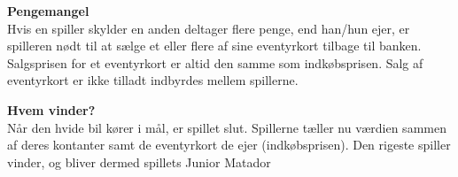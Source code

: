 \textbf{Pengemangel}
\\Hvis en spiller skylder en anden deltager flere penge, end han/hun ejer, er spilleren nødt til at sælge et eller flere af sine eventyrkort tilbage til banken. 
Salgsprisen for et eventyrkort er altid den samme som indkøbsprisen. 
Salg af eventyrkort er ikke tilladt indbyrdes mellem spillerne.

\textbf{Hvem vinder?}
\\Når den hvide bil kører i mål, er spillet slut. 
Spillerne tæller nu værdien sammen af deres kontanter samt de eventyrkort de ejer (indkøbsprisen). 
Den rigeste spiller vinder, og bliver dermed spillets Junior Matador 